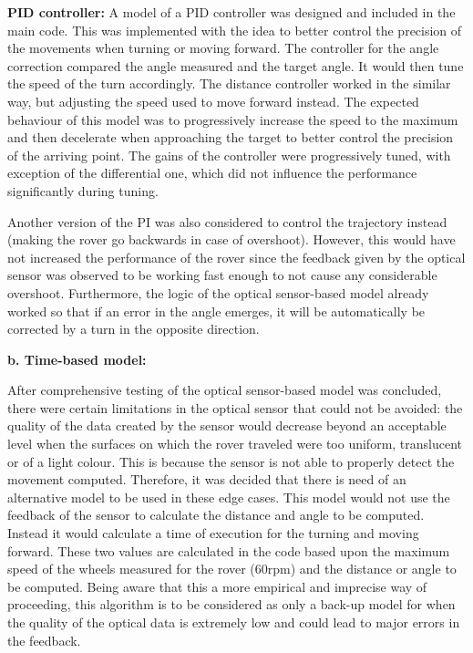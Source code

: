 \documentclass[10pt,twoside]{article}
\begin{document}
\textbf{PID controller:} A model of a PID controller was designed and included in the main code. This was implemented with the idea to better control the precision of the movements when turning or moving forward. The controller for the angle correction compared the angle measured and the target angle. It would then tune the speed of the turn accordingly. The distance controller worked in the similar way, but adjusting the speed used to move forward instead. The expected behaviour of this model was to progressively increase the speed to the maximum and then decelerate when approaching the target to better control the precision of the arriving point. The gains of the controller were progressively tuned, with exception of the differential one, which did not influence the performance significantly during tuning. 

Another version of the PI was also considered to control the trajectory instead (making the rover go backwards in case of overshoot). However, this would have not increased the performance of the rover since the feedback given by the optical sensor was observed to be working fast enough to not cause any considerable overshoot. Furthermore, the logic of the optical sensor-based model already worked so that if an error in the angle emerges, it will be automatically be corrected by a turn in the opposite direction.

\textbf{b.	Time-based model:}

After comprehensive testing of the optical sensor-based model was concluded, there were certain limitations in the optical sensor that could not be avoided: the quality of the data created by the sensor would decrease beyond an acceptable level when the surfaces on which the rover traveled were too uniform, translucent or of a light colour. This is because the sensor is not able to properly detect the movement computed. Therefore, it was decided that there is need of an alternative model to be used in these edge cases. This model would not use the feedback of the sensor to calculate the distance and angle to be computed. Instead it would calculate a time of execution for the turning and moving forward. These two values are calculated in the code based upon the maximum speed of the wheels measured for the rover (60rpm) and the distance or angle to be computed.
Being aware that this a more empirical and imprecise way of proceeding, this algorithm is to be considered as only a back-up model for when the quality of the optical data is extremely low and could lead to major errors in the feedback.
\end{document}
